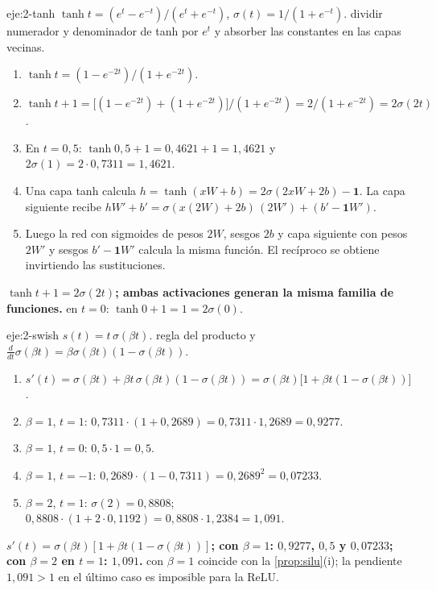 \begin{solucion}{eje:2-tanh}
\datos $\tanh t=(e^{t}-e^{-t})/(e^{t}+e^{-t})$, $\sigma(t)=1/(1+e^{-t})$.
\planteamiento dividir numerador y denominador de tanh por $e^{t}$ y absorber las constantes en las capas vecinas.
\pasos
\begin{enumerate}[label=\arabic*.]
  \item $\tanh t=(1-e^{-2t})/(1+e^{-2t})$.
  \item $\tanh t+1=\bigl[(1-e^{-2t})+(1+e^{-2t})\bigr]/(1+e^{-2t})=2/(1+e^{-2t})=2\sigma(2t)$.
  \item En $t=0{,}5$: $\tanh 0{,}5+1=0{,}4621+1=1{,}4621$ y $2\sigma(1)=2\cdot 0{,}7311=1{,}4621$.
  \item Una capa tanh calcula $h=\tanh(xW+b)=2\sigma(2xW+2b)-\mathbf 1$. La capa siguiente recibe $hW'+b'=\sigma(x(2W)+2b)\,(2W')+(b'-\mathbf 1W')$.
  \item Luego la red con sigmoides de pesos $2W$, sesgos $2b$ y capa siguiente con pesos $2W'$ y sesgos $b'-\mathbf 1W'$ calcula la misma función. El recíproco se obtiene invirtiendo las sustituciones.
\end{enumerate}
\resultado \textbf{$\tanh t+1=2\sigma(2t)$; ambas activaciones generan la misma familia de funciones.}
\comprobacion en $t=0$: $\tanh 0+1=1=2\sigma(0)$.
\end{solucion}

\begin{solucion}{eje:2-swish}
\datos $s(t)=t\,\sigma(\beta t)$.
\planteamiento regla del producto y $\frac{d}{dt}\sigma(\beta t)=\beta\sigma(\beta t)(1-\sigma(\beta t))$.
\pasos
\begin{enumerate}[label=\arabic*.]
  \item $s'(t)=\sigma(\beta t)+\beta t\,\sigma(\beta t)(1-\sigma(\beta t))=\sigma(\beta t)\bigl[1+\beta t(1-\sigma(\beta t))\bigr]$.
  \item $\beta=1$, $t=1$: $0{,}7311\cdot(1+0{,}2689)=0{,}7311\cdot 1{,}2689=0{,}9277$.
  \item $\beta=1$, $t=0$: $0{,}5\cdot 1=0{,}5$.
  \item $\beta=1$, $t=-1$: $0{,}2689\cdot(1-0{,}7311)=0{,}2689^{2}=0{,}07233$.
  \item $\beta=2$, $t=1$: $\sigma(2)=0{,}8808$; $0{,}8808\cdot(1+2\cdot 0{,}1192)=0{,}8808\cdot 1{,}2384=1{,}091$.
\end{enumerate}
\resultado \textbf{$s'(t)=\sigma(\beta t)[1+\beta t(1-\sigma(\beta t))]$; con $\beta=1$: $0{,}9277$, $0{,}5$ y $0{,}07233$; con $\beta=2$ en $t=1$: $1{,}091$.}
\comprobacion con $\beta=1$ coincide con la \cref{prop:silu}(i); la pendiente $1{,}091>1$ en el último caso es imposible para la ReLU.
\end{solucion}

